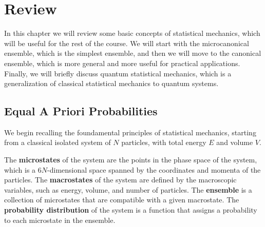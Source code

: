 \chapter{Review}

In this chapter we will review some basic concepts of statistical mechanics, which will be useful for the rest of the course. We will start with the microcanonical ensemble, which is the simplest ensemble, and then we will move to the canonical ensemble, which is more general and more useful for practical applications. Finally, we will briefly discuss quantum statistical mechanics, which is a generalization of classical statistical mechanics to quantum systems.

\section{Equal A Priori Probabilities}

We begin recalling the foundamental principles of statistical mechanics, starting from a classical isolated system of \(N\) particles, with total energy \(E\) and volume \(V\).

The \textbf{microstates} of the system are the points in the phase space of the system, which is a \(6N\)-dimensional space spanned by the coordinates and momenta of the particles. The \textbf{macrostates} of the system are defined by the macroscopic variables, such as energy, volume, and number of particles. The \textbf{ensemble} is a collection of microstates that are compatible with a given macrostate. The \textbf{probability distribution} of the system is a function that assigns a probability to each microstate in the ensemble.

